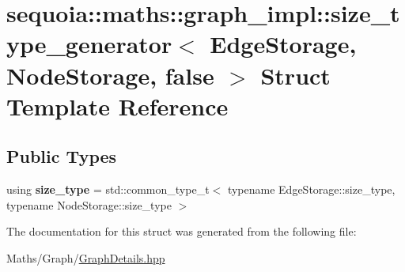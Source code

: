 \hypertarget{structsequoia_1_1maths_1_1graph__impl_1_1size__type__generator_3_01_edge_storage_00_01_node_storage_00_01false_01_4}{}\section{sequoia\+::maths\+::graph\+\_\+impl\+::size\+\_\+type\+\_\+generator$<$ Edge\+Storage, Node\+Storage, false $>$ Struct Template Reference}
\label{structsequoia_1_1maths_1_1graph__impl_1_1size__type__generator_3_01_edge_storage_00_01_node_storage_00_01false_01_4}
\subsection*{Public Types}
\begin{DoxyCompactItemize}
\item 
\mbox{\label{structsequoia_1_1maths_1_1graph__impl_1_1size__type__generator_3_01_edge_storage_00_01_node_storage_00_01false_01_4_a5fe536bdbcc12ade04a67b8f15c0950b}} 
using {\bfseries size\+\_\+type} = std\+::common\+\_\+type\+\_\+t$<$ typename Edge\+Storage\+::size\+\_\+type, typename Node\+Storage\+::size\+\_\+type $>$
\end{DoxyCompactItemize}


The documentation for this struct was generated from the following file\+:\begin{DoxyCompactItemize}
\item 
Maths/\+Graph/\mbox{\hyperlink{_graph_details_8hpp}{Graph\+Details.\+hpp}}\end{DoxyCompactItemize}
